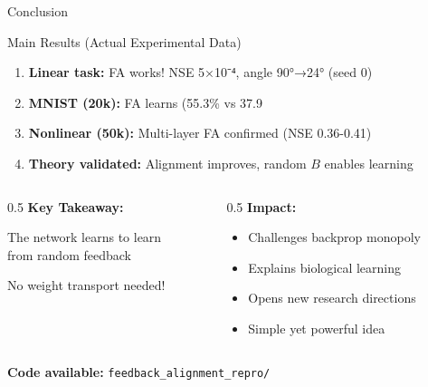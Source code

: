 \documentclass[aspectratio=169,10pt]{beamer}
\begin{document}
\begin{frame}{Conclusion}
  \begin{block}{Main Results (Actual Experimental Data)}
    \begin{enumerate}
      \item \textbf{Linear task:} FA works! NSE 5×10⁻⁴, angle 90°→24° (seed 0)
      \item \textbf{MNIST (20k):} FA learns (55.3\% vs 37.9%
      \item \textbf{Nonlinear (50k):} Multi-layer FA confirmed (NSE 0.36-0.41)
      \item \textbf{Theory validated:} Alignment improves, random $B$ enables learning
    \end{enumerate}
  \end{block}

  \vspace{0.3cm}
  \begin{columns}[T]
    \begin{column}{0.5\textwidth}
      \textbf{Key Takeaway:}

      \begin{center}
        \Large
        The network \alert{learns to learn}\\
        from random feedback
      \end{center}

      \vspace{0.3cm}
      No weight transport needed!
    \end{column}

    \begin{column}{0.5\textwidth}
      \textbf{Impact:}
      \begin{itemize}
        \item Challenges backprop monopoly
        \item Explains biological learning
        \item Opens new research directions
        \item Simple yet powerful idea
      \end{itemize}
    \end{column}
  \end{columns}

  \vspace{0.5cm}
  \begin{center}
    \large
    \textbf{Code available:} \texttt{feedback\_alignment\_repro/}
  \end{center}
\end{frame}
\end{document}
